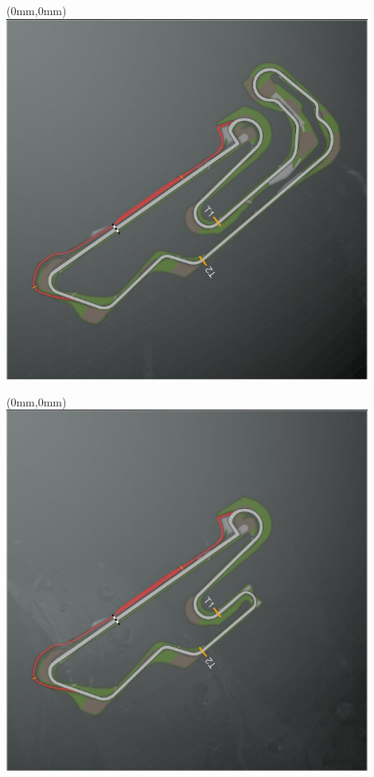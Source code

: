 \null\newpage
\begin{textblock*}{30mm}(0mm,0mm)%
\includegraphics[width=120mm]{TR/2015-05-20_00045.png}
\end{textblock*}
\null\newpage
\begin{textblock*}{30mm}(0mm,0mm)%
\includegraphics[width=120mm]{TR/2015-05-20_00046.png}
\end{textblock*}

